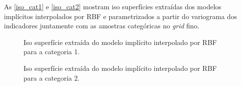 As \autoref{iso_cat1} e \autoref{iso_cat2} mostram iso superfícies extraídas dos modelos implícitos interpolados por RBF e parametrizados a partir do variograma dos indicadores juntamente com as amostras categóricas no \textit{grid} fino. 

\begin{figure}[H]
    \caption{Iso superfície extraída do modelo implícito interpolado por RBF para a categoria 1.} \label{iso_cat1}
     \centering
\end{figure}

\begin{figure}[H] 
    \caption{Iso superfície extraída do modelo implícito interpolado por RBF para a categoria 2.} \label{iso_cat2}
     \centering
\end{figure}

